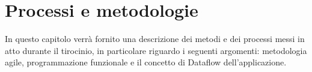 
\chapter{Processi e metodologie}
\label{cap:processi-metodologie}

In questo capitolo verrà fornito una descrizione dei metodi e dei processi messi in atto durante il tirocinio, in particolare riguardo i seguenti argomenti: metodologia agile, programmazione funzionale e il concetto di Dataflow dell'applicazione.

